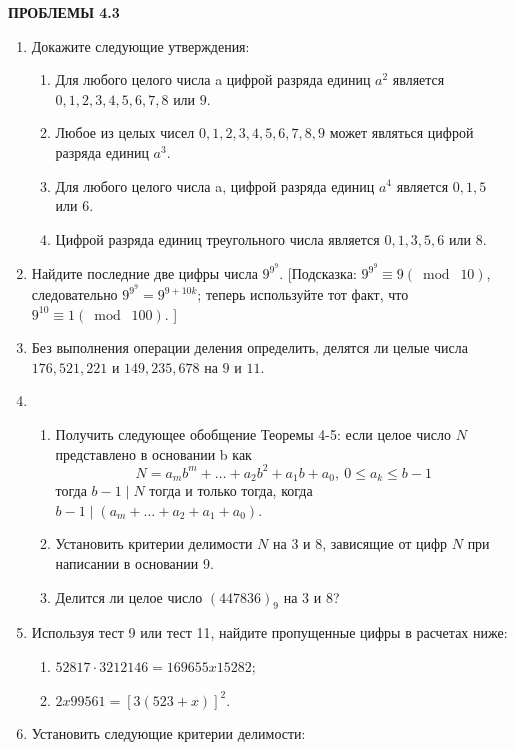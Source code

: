\documentclass[11pt]{article}
\begin{document}
\begin{center}
	\LARGE {\textsf {\textbf {ПРОБЛЕМЫ 4.3}}}\\[5mm]
\end{center}

\begin{enumerate} 
\item Докажите следующие утверждения:
\begin{enumerate} 
\item Для любого целого числа a цифрой разряда единиц $ a^{2} $ является $ 0,1,2,3,4,5,6,7,8 $ или $ 9 $.
\item Любое из целых чисел $ 0,1,2,3,4,5,6,7,8,9 $ может являться цифрой разряда единиц $ a^{3} $.
\item Для любого целого числа a, цифрой разряда единиц $ a^{4} $ является $ 0,1,5 $ или $ 6 $.
\item Цифрой разряда единиц треугольного числа является $ 0,1,3,5,6 $ или $ 8 $.
\end{enumerate}
\item Найдите последние две цифры числа $ 9^{9^{9}} $. [Подсказка: $ 9^{9^{9}}\equiv 9(\bmod\; 10) $, следовательно $ 9^{9^{9}}=9^{9+10k} $; теперь используйте тот факт, что $ 9^{10}\equiv 1(\bmod\; 100). $ ]
\item Без выполнения операции деления определить, делятся ли целые числа $ 176,521,221 $ и $ 149,235,678 $ на $ 9 $ и $ 11 $.
\item 
\begin{enumerate}
	\item Получить следующее обобщение Теоремы 4-5: если целое число $N$ представлено в основании b как $$N=a_{m}b^{m}+\ldots+a_{2}b^{2}+a_{1}b+a_{0},\ 0\leq a_{k}\leq b-1  $$ тогда $ b-1\mid N $ тогда и только тогда, когда $ b-1\mid (a_{m}+\ldots+a_{2}+a_{1}+a_{0}) $.
	\item Установить критерии делимости $ N $ на $3$ и $8$, зависящие от цифр $N$ при написании в основании 9.
	\item Делится ли целое число $ (447836)_{9}$ на $3$ и $8$?
\end{enumerate}
\item Используя тест 9 или тест 11, найдите пропущенные цифры в расчетах ниже:
\begin{enumerate}
\item $ 52817\cdot3212146=169655x15282 $;
\item $2x99561=[3(523+x)]^{2}$.	
\end{enumerate}
\item Установить следующие критерии делимости:

\end{enumerate}
\end{document}
